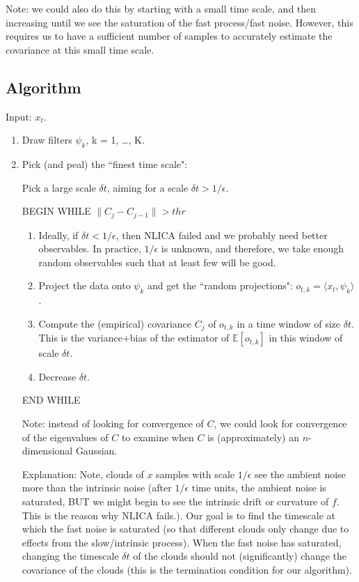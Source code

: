 \documentclass[12pt]{article}
\begin{document}
Note: we could also do this by starting with a small time scale, and then increasing until we see the saturation of the fast process/fast noise. 
%
However, this requires us to have a sufficient number of samples to accurately estimate the covariance at this small time scale. 


\subsection{Algorithm}

Input: $x_t$.

\begin{enumerate}
	
	\item
	Draw filters $\psi _k$, k = 1, \ldots, K.
	
	\item
	\label{algo:iter_begin}
	Pick (and peal) the ``finest time scale":
	
	Pick a large scale $\delta t$, aiming for a scale $\delta t > 1/\epsilon$.
		
		
	BEGIN WHILE $\| C_j - C_{j-1} \| > thr$

	\begin{enumerate}
		\item
		Ideally, if $\delta t < 1/\epsilon$, then NLICA failed and we probably need better observables. In practice, $1/\epsilon$ is unknown, and therefore, we take enough random observables such that at least few will be good.
		
		\item
		Project the data onto $\psi _k$ and get the ``random projections": $o_{t,k} = \langle x_t, \psi _k \rangle$.
		
		\item
		Compute the (empirical) covariance $C_j$ of $o_{t,k}$ in a time window of size $\delta t$. This is the variance+bias of the estimator of $\mathbb{E}[o_{t,k}]$ in this window of scale $\delta t$.
			
		\item
		Decrease $\delta t$.
		
	\end{enumerate}	
	END WHILE
	
	Note: instead of looking for convergence of $C$, we could look for convergence of the eigenvalues of $C$ to examine when $C$ is (approximately) an $n$-dimensional Gaussian. 
	
	Explanation: Note, clouds of $x$ samples with scale $1/\epsilon$ see the ambient noise more than the intrinsic noise (after $1/\epsilon$ time units, the ambient noise is saturated, BUT we might begin to see the intrinsic drift or curvature of $f$. This is the reason why NLICA fails.). 
Our goal is to find the timescale at which the fast noise is saturated (so that different clouds only change due to effects from the slow/intrinsic process). 
%
When the fast noise has saturated, changing the timescale $\delta t$ of the clouds should not (significantly) change the covariance of the clouds (this is the termination condition for our algorithm). 


\end{enumerate}
\end{document}
